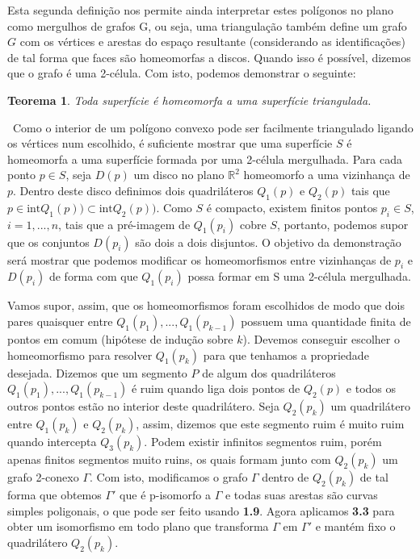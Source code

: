 \documentclass[12pt,a4paper]{article}
\newtheorem{thrm}[mydef]{Teorema}
\def\dem{\par\smallbreak\noindent {\textit{ Demonstração:}} \ }
\theoremstyle{definition}
\begin{document}
Esta segunda definição nos permite ainda interpretar estes polígonos no plano como mergulhos de grafos G, ou seja, uma triangulação também define um grafo $G$ com os vértices e arestas do espaço resultante (considerando as identificações) de tal forma que faces são homeomorfas a discos. Quando isso é possível, dizemos que o grafo é uma 2-célula. Com isto, podemos demonstrar o seguinte: 

\begin{thrm}
  
    Toda superfície é homeomorfa a uma superfície triangulada.
  
\end{thrm}

\dem Como o interior de um polígono convexo pode ser facilmente triangulado ligando os vértices num escolhido, é suficiente mostrar que uma superfície $S$ é homeomorfa a uma superfície formada por uma 2-célula mergulhada. Para cada ponto $p\in S$, seja $D(p)$ um disco no plano $\mathbb{R}^2$ homeomorfo a uma vizinhança de $p$. Dentro deste disco definimos dois quadriláteros $Q_1(p)$ e $Q_2(p)$ tais que $p\in \text{int}Q_1(p)) \subset \text{int}Q_2(p))$. Como $S$ é compacto, existem finitos pontos $p_i\in S$, $i=1,...,n$, tais que a pré-imagem de $Q_1(p_i)$ cobre $S$, portanto, podemos supor que os conjuntos $D(p_i)$ são dois a dois disjuntos. O objetivo da demonstração será mostrar que podemos modificar os homeomorfismos entre vizinhanças de $p_i$ e $D(p_i)$ de forma com que $Q_1(p_i)$ possa formar em S uma 2-célula mergulhada. 

Vamos supor, assim, que os homeomorfismos foram escolhidos de modo que dois pares quaisquer entre $Q_1(p_1),...,Q_1(p_{k-1})$ possuem uma quantidade finita de pontos em comum (hipótese de indução sobre $k$). Devemos conseguir escolher o homeomorfismo para resolver $Q_1(p_{k})$ para que tenhamos a propriedade desejada. Dizemos que um segmento $P$ de algum dos quadriláteros $Q_1(p_1),...,Q_1(p_{k-1})$ é ruim quando liga dois pontos de $Q_2(p)$ e todos os outros pontos estão no interior deste quadrilátero. Seja $Q_2(p_k)$ um quadrilátero entre $Q_1(p_k)$ e $Q_2(p_k)$, assim, dizemos que este segmento ruim é muito ruim quando intercepta $Q_3(p_k)$. Podem existir infinitos segmentos ruim, porém apenas finitos segmentos muito ruins, os quais formam junto com $Q_2(p_k)$ um grafo 2-conexo $\Gamma$. Com isto, modificamos o grafo $\Gamma$ dentro de $Q_2(p_k)$ de tal forma que obtemos $\Gamma'$ que é p-isomorfo a $\Gamma$ e todas suas arestas são curvas simples poligonais, o que pode ser feito usando \textbf{1.9}. Agora aplicamos \textbf{3.3} para obter um isomorfismo em todo plano que transforma $\Gamma$ em $\Gamma'$ e mantém fixo o quadrilátero $Q_2(p_k)$. 
\end{document}
